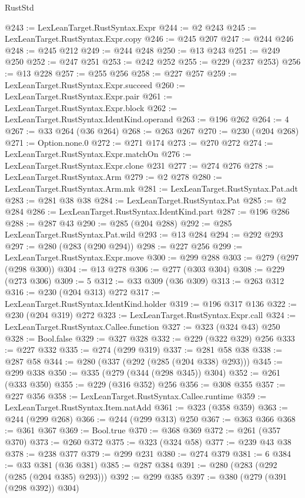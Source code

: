 \begin{lexlean}{RustStd}
\begin{coremodule}
@243 := LexLeanTarget.RustSyntax.Expr
@244 := @2 @243
@245 := LexLeanTarget.RustSyntax.Expr.copy
@246 := @245 @207
@247 := @244 @246
@248 := @245 @212
@249 := @244 @248
@250 := @13 @243
@251 := @249 @250
@252 := @247 @251
@253 := @242 @252
@255 := @229 (@237 @253)
@256 := @13 @228
@257 := @255 @256
@258 := @227 @257
@259 := LexLeanTarget.RustSyntax.Expr.succeed
@260 := LexLeanTarget.RustSyntax.Expr.pair
@261 := LexLeanTarget.RustSyntax.Expr.block
@262 := LexLeanTarget.RustSyntax.IdentKind.operand
@263 := @196 @262
@264 := 4
@267 := @33 @264 (@36 @264)
@268 := @263 @267
@270 := @230 (@204 @268)
@271 := Option.none.{0}
@272 := @271 @174
@273 := @270 @272
@274 := LexLeanTarget.RustSyntax.Expr.matchOn
@276 := LexLeanTarget.RustSyntax.Expr.clone @231
@277 := @274 @276
@278 := LexLeanTarget.RustSyntax.Arm
@279 := @2 @278
@280 := LexLeanTarget.RustSyntax.Arm.mk
@281 := LexLeanTarget.RustSyntax.Pat.adt
@283 := @281 @38 @38
@284 := LexLeanTarget.RustSyntax.Pat
@285 := @2 @284
@286 := LexLeanTarget.RustSyntax.IdentKind.part
@287 := @196 @286
@288 := @287 @43
@290 := @285 (@204 @288)
@292 := @285 LexLeanTarget.RustSyntax.Pat.wild
@293 := @13 @284
@294 := @292 @293
@297 := @280 (@283 (@290 @294))
@298 := @227 @256
@299 := LexLeanTarget.RustSyntax.Expr.move
@300 := @299 @288
@303 := @279 (@297 (@298 @300))
@304 := @13 @278
@306 := @277 (@303 @304)
@308 := @229 (@273 @306)
@309 := 5
@312 := @33 @309 (@36 @309)
@313 := @263 @312
@316 := @230 (@204 @313) @272
@317 := LexLeanTarget.RustSyntax.IdentKind.holder
@319 := @196 @317 @136
@322 := @230 (@204 @319) @272
@323 := LexLeanTarget.RustSyntax.Expr.call
@324 := LexLeanTarget.RustSyntax.Callee.function
@327 := @323 (@324 @43) @250
@328 := Bool.false
@329 := @327 @328
@332 := @229 (@322 @329) @256
@333 := @227 @332
@335 := @274 (@299 @319)
@337 := @281 @58 @38
@338 := @287 @58
@344 := @280 (@337 (@292 (@285 (@204 @338) @293)))
@345 := @299 @338
@350 := @335 (@279 (@344 (@298 @345)) @304)
@352 := @261 (@333 @350)
@355 := @229 (@316 @352) @256
@356 := @308 @355
@357 := @227 @356
@358 := LexLeanTarget.RustSyntax.Callee.runtime
@359 := LexLeanTarget.RustSyntax.Item.natAdd
@361 := @323 (@358 @359)
@363 := @244 (@299 @268)
@366 := @244 (@299 @313) @250
@367 := @363 @366
@368 := @361 @367
@369 := Bool.true
@370 := @368 @369
@372 := @261 (@357 @370)
@373 := @260 @372
@375 := @323 (@324 @58)
@377 := @239 @43 @38
@378 := @238 @377
@379 := @299 @231
@380 := @274 @379
@381 := 6
@384 := @33 @381 (@36 @381)
@385 := @287 @384
@391 := @280 (@283 (@292 (@285 (@204 @385) @293)))
@392 := @299 @385
@397 := @380 (@279 (@391 (@298 @392)) @304)

\end{coremodule}
\end{lexlean}
